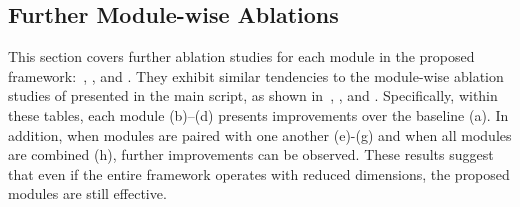 \documentclass[10pt,twocolumn,letterpaper]{article}
\begin{document}
    \subsection{Further Module-wise Ablations} \label{further_abl}
        This section covers further ablation studies for each module in the proposed framework:~, , and . They exhibit similar tendencies to the module-wise ablation studies of  presented in the main script, as shown in~, , and . Specifically, within these tables, each module (b)–(d) presents improvements over the baseline (a). In addition, when modules are paired with one another (e)-(g) and when all modules are combined (h), further improvements can be observed. These results suggest that even if the entire framework operates with reduced dimensions, the proposed modules are still effective.

    
    
\end{document}
